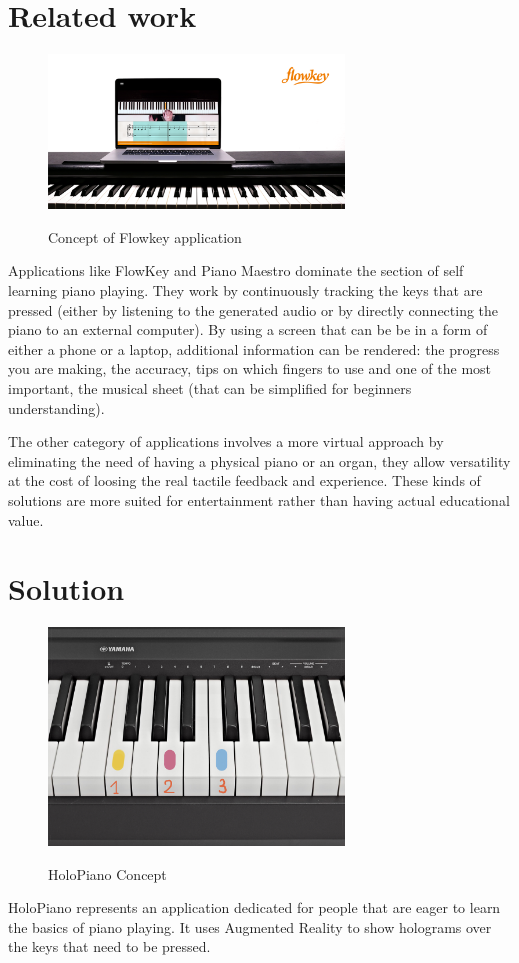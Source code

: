 \documentclass[12 pct]{report}
\begin{document}
\section{Related work}
\begin{figure}[H]
\includegraphics[width=0.7\textwidth]{flowkey}
\centering
\label{fig:hololens}
\caption{Concept of Flowkey application}
\end{figure}

Applications like FlowKey and Piano Maestro dominate the section of self learning piano playing. They work by continuously tracking the keys that are pressed (either by listening to the generated audio or by directly connecting the piano to an external computer). By using a screen that can be be in a form of either a phone or a laptop, additional information can be rendered: the progress you are making, the accuracy, tips on which fingers to use and one of the most important, the musical sheet (that can be simplified for beginners understanding).


The other category of applications involves a more virtual approach by eliminating the need of having a physical piano or an organ, they allow versatility at the cost of loosing the real tactile feedback and experience. These kinds of solutions are more suited for entertainment rather than having actual educational value.

\section{Solution}
\begin{figure}[H]
\includegraphics[width=0.7\textwidth]{piano}
\centering
\label{fig:feature-points}
\caption{HoloPiano Concept}
\end{figure}
HoloPiano represents an application dedicated for people that are eager to learn the basics of piano playing. It uses Augmented Reality to show holograms over the keys that need to be pressed.
\end{document}
